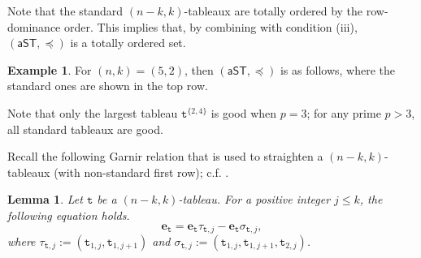 \documentclass[a4paper]{amsart}
\numberwithin{equation}{subsection}
\newcommand\drawtbx[2]{%
	\begin{scope}[shift={#2}]
    \tableauRow=0
    \foreach \Row in {#1} {
       \tableauCol=1
       \foreach\k in \Row {
          \draw(\the\tableauCol,\the\tableauRow)+(-.5,-.5)rectangle++(.5,.5);
          \draw(\the\tableauCol,\the\tableauRow)node{\k};
          \global\advance\tableauCol by 1
       }
       \global\advance\tableauRow by -1
    }
	\end{scope}
}
\newtheorem{lemma}[theorem]{Lemma}
\theoremstyle{definition}
\newtheorem{example}[theorem]{Example}
\newcommand{\bfe}{\pmb{e}}
\newcommand{\tbx}{\mathtt{t}}
\newcommand{\aST}{\mathsf{aST}}
\numberwithin{equation}{subsection}
\begin{document}
Note that the standard $(n-k,k)$-tableaux are totally ordered by the row-dominance order.  This implies that, by combining with condition (iii), $(\aST,\preceq)$ is a totally ordered set.

\begin{example}
For $(n,k)=(5,2)$, then $(\aST,\preceq)$ is as follows, where the standard ones are shown in the top row.
\begin{center}\end{center}
Note that only the largest tableau $\tbx^{\{2,4\}}$ is good when $p=3$; for any prime $p>3$, all standard tableaux are good.
\end{example} 


Recall the following Garnir relation that is used to straighten a $(n-k,k)$-tableaux (with non-standard first row); c.f. \cite[Section 7, 8]{James3}.
\begin{lemma}\label{lem:Garnir}
Let $\tbx$ be a $(n-k,k)$-tableau.
For a positive integer $j\leq k$, the following equation holds.
\[
\bfe_\tbx = \bfe_\tbx\tau_{\tbx,j} - \bfe_\tbx \sigma_{\tbx,j},
\]
where $\tau_{\tbx,j}:=(\tbx_{1,j}, \tbx_{1,j+1})$ and $\sigma_{\tbx,j}:=(\tbx_{1,j}, \tbx_{1,j+1}, \tbx_{2,j})$.
\end{lemma}
\end{document}
